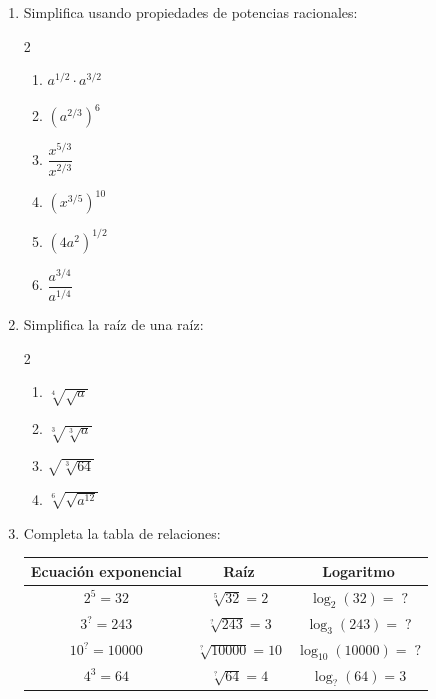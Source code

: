 \documentclass[11pt, letterpaper]{article}
\begin{document}
\begin{enumerate}[label=\textbf{\arabic*.}, leftmargin=*, resume]
  \item Simplifica usando propiedades de potencias racionales:
  \begin{multicols}{2}
  \begin{enumerate}[label=\alph*)]
    \item $a^{1/2}\cdot a^{3/2}$
    \item $\left(a^{2/3}\right)^6$
    \item $\dfrac{x^{5/3}}{x^{2/3}}$
    \item $\left(x^{3/5}\right)^{10}$
    \item $(4a^2)^{1/2}$
    \item $\dfrac{a^{3/4}}{a^{1/4}}$
  \end{enumerate}
  \end{multicols}

  \item Simplifica la raíz de una raíz:
  \begin{multicols}{2}
  \begin{enumerate}[label=\alph*)]
    \item $\sqrt[4]{\sqrt{a}}$
    \item $\sqrt[3]{\sqrt[3]{a}}$
    \item $\sqrt{\sqrt[3]{64}}$
    \item $\sqrt[6]{\sqrt{a^{12}}}$
  \end{enumerate}
  \end{multicols}

  \item Completa la tabla de relaciones:

  \begin{center}
  \renewcommand{\arraystretch}{1.5}
  \begin{tabular}{|c|c|c|}
  \hline
  \textbf{Ecuación exponencial} & \textbf{Raíz} & \textbf{Logaritmo}\\
  \hline
  $2^5=32$ & $\sqrt[5]{32}=2$ & $\log_2(32)=\;?$\\
  \hline
  $3^{?}=243$ & $\sqrt[?]{243}=3$ & $\log_3(243)=\;?$\\
  \hline
  $10^{?}=10000$ & $\sqrt[?]{10000}=10$ & $\log_{10}(10000)=\;?$\\
  \hline
  $4^3=64$ & $\sqrt[?]{64}=4$ & $\log_{?}(64)=3$\\
  \hline
  \end{tabular}
  \end{center}
\end{enumerate}
\end{document}
